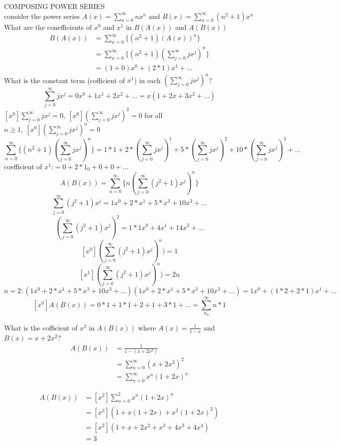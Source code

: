 \documentclass{article}
\begin{document}
COMPOSING POWER SERIES \\
consider the power series $A(x)=\sum_{n=0}^\infty nx^n$ and $B(x) = \sum_{n=0}^\infty (n^2+1)x^n$\\
What are the conefficients of $x^0$ and $x^1$ in $B(A(x))$ and $A(B(x))$\\
\begin{align*}
B(A(x))&=\sum_{n=0}^\infty \{(n^2+1)(A(x))^n\}\\
&=\sum_{n=0}^\infty\{(n^2+1)(\sum_{j=0}^\infty jx^j)^n\}\\
&=(1+0)x^0+(2*1)x^1+\hdots
\end{align*}
What is the constant term (cofficient of $x^1$) in each $(\sum_{j=0}^\infty jx^j)^n$?\\
$$\sum_{j=0}^\infty jx^j=0x^0+1x^1+2x^2+\hdots = x(1+2x+3x^2+\hdots)$$
$[x^0]\sum_{j=0}^\infty jx^j = 0,\ [x^0](\sum_{j=0}^\infty jx^j)^2=0$ for all $n\geq 1,\ [x^0](\sum_{j=0}^\infty jx^j)^n=0$\\
$$\sum_{n=0}^\infty \{(n^2+1)(\sum_{j=0}^\infty jx^j)^n\}=1*1+2*(\sum_{j=0}^\infty jx^j)^1 + 5*(\sum_{j=0}^\infty jx^j)^2+ 10*(\sum_{j=0}^\infty jx^j)^3+\hdots$$
coefficient of $x^1$:$=0+2*1_0+0+0+\hdots$\\

$$A(B(x))=\sum_{n=0}^\infty \{n(\sum_{j=0}^\infty(j^2+1)x^j)^n\}$$
$$\sum_{j=0}^\infty(j^2+1)x^j=1x^0+2*x^1+5*x^3+10x^3+\hdots$$
$$(\sum_{j=0}^\infty(j^2+1)x^j)^2=1*1x^0+4x^1+14x^2+\dots$$
$$[x^0](\sum_{j=0}^\infty(j^2+1)x^j)^n)=1$$
$$[x^1](\sum_{j=0}^\infty(j^2+1)x^j)^n)=2n$$
$$n=2: (1x^0+2*x^1+5*x^3+10x^3+\hdots)(1x^0+2*x^1+5*x^3+10x^3+\hdots)=1x^0+(1*2+2*1)x^1+\hdots$$
$$[x^0]A(B(x))=0*1+1*1+2+1+3*1+\hdots = \sum_{n_0}^\infty n*1$$

What is the cofficient of $x^2$ in $A(B(x))$ where $A(x)=\frac{1}{1-x}$ and $B(x)=x+2x^2$?\\
\begin{align*}
A(B(x))&=\frac{1}{1-(x+2x^2)}\\
&=\sum_{n=0}^\infty (x+2x^2)^2\\
&=\sum_{n=0}^\infty x^n(1+2x)^n
\end{align*}

\begin{align*}
[x^2]A(B(x))&=[x^2]\sum_{n=0}^2x^n(1+2x)^n\\
&=[x^2](1+x(1+2x)+x^2(1+2x)^2)\\
&=[x^2](1+x+2x^2+x^2+4x^3+4x^4)\\
&=3
\end{align*}
\end{document}
